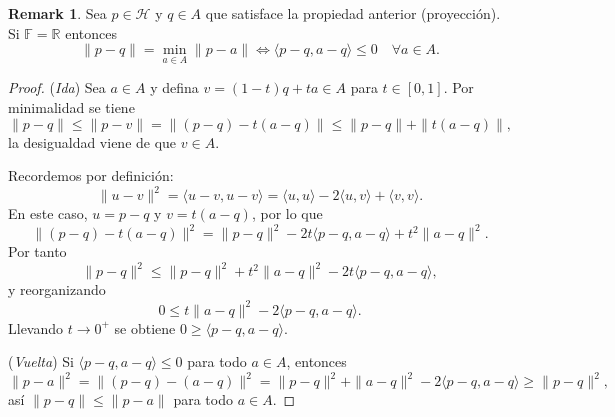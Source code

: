 \documentclass[11pt]{article}
\theoremstyle{definition}
\newtheorem{remark}[definition]{Remark}
\theoremstyle{plain}
\begin{document}
\begin{remark}
Sea $p\in\mathcal{H}$ y $q\in A$ que satisface la propiedad anterior (proyección). Si $\mathbb{F}=\mathbb{R}$ entonces
\[\|p-q\|=\min_{a\in A}\|p-a\|\iff\langle p-q,a-q\rangle\le0\quad\forall a\in A.
\]
\begin{proof}
(\emph{Ida}) Sea $a\in A$ y defina $v=(1-t)q+ta\in A$ para $t\in[0,1]$. Por minimalidad se tiene
\[\|p-q\|\le\|p-v\|=\|(p-q)-t(a-q)\|\le\|p-q\|+\|t(a-q)\|,\]
la desigualdad viene de que $v\in A$.

Recordemos por definición:
\[\|u-v\|^2=\langle u-v,u-v\rangle=\langle u,u\rangle-2\langle u,v\rangle+\langle v,v\rangle.\]
En este caso, $u=p-q$ y $v=t(a-q)$, por lo que
\[\|(p-q)-t(a-q)\|^2=\|p-q\|^2-2t\langle p-q,a-q\rangle+t^2\|a-q\|^2.\]
Por tanto
\[\|p-q\|^2\le\|p-q\|^2+t^2\|a-q\|^2-2t\langle p-q,a-q\rangle,\]
y reorganizando
\[0\le t\|a-q\|^2-2\langle p-q,a-q\rangle.\]
Llevando $t\to0^+$ se obtiene $0\ge\langle p-q,a-q\rangle$.

(\emph{Vuelta}) Si $\langle p-q,a-q\rangle\le0$ para todo $a\in A$, entonces
\[\|p-a\|^2=\|(p-q)-(a-q)\|^2=\|p-q\|^2+\|a-q\|^2-2\langle p-q,a-q\rangle\ge\|p-q\|^2,\]
así $\|p-q\|\le\|p-a\|$ para todo $a\in A$.
\end{proof}
\end{remark}
\end{document}
